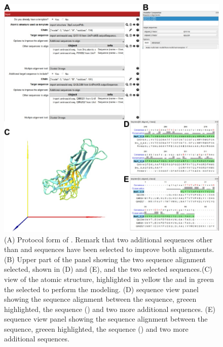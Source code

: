 \begin{itemize}
 
                            \begin{figure}[H]
                            \centering 
                            \captionsetup{width=.9\linewidth} 
                            \includegraphics[width=.9\textwidth]{Images_appendix/Fig306.pdf}
                            \caption{(A) Protocol form of . Remark that two additional sequences other than  and  sequences have been selected to improve both alignments. (B) Upper part of the \chimera {} panel showing the two sequence alignment selected, shown in (D) and (E), and the two selected  sequences.(C) \chimera view of the  atomic structure, highlighted in yellow the  and in green the  selected to perform the modeling. (D) \chimera sequence view panel showing the sequence alignment between the   sequence, greeen highlighted, the  sequence () and two more additional sequences. (E) \chimera sequence view panel showing the sequence alignment between the   sequence, greeen highlighted, the  sequence () and two more additional sequences.}  
                            \label{fig:app_protocol_seqHomology_3}
                            \end{figure}
                            

\end{itemize}
